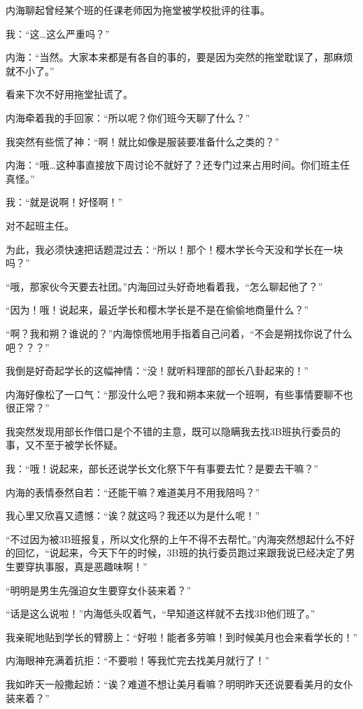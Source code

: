 内海聊起曾经某个班的任课老师因为拖堂被学校批评的往事。

我：“这…这么严重吗？”

内海：“当然。大家本来都是有各自的事的，要是因为突然的拖堂耽误了，那麻烦就不小了。”

看来下次不好用拖堂扯谎了。

内海牵着我的手回家：“所以呢？你们班今天聊了什么？”

我突然有些慌了神：“啊！就比如像是服装要准备什么之类的？”

内海：“哦…这种事直接放下周讨论不就好了？还专门过来占用时间。你们班主任真怪。”

我：“就是说啊！好怪啊！”

对不起班主任。

为此，我必须快速把话题混过去：“所以！那个！樱木学长今天没和学长在一块吗？”

“哦，那家伙今天要去社团。”内海回过头好奇地看着我，“怎么聊起他了？”

“因为！哦！说起来，最近学长和樱木学长是不是在偷偷地商量什么？”

“啊？我和朔？谁说的？”内海惊慌地用手指着自己问着，“不会是朔找你说了什么吧？？？”

我倒是好奇起学长的这幅神情：“没！就听料理部的部长八卦起来的！”

内海好像松了一口气：“那没什么吧？我和朔本来就一个班啊，有些事情要聊不也很正常？”

我突然发现用部长作借口是个不错的主意，既可以隐瞒我去找3B班执行委员的事，又不至于被学长怀疑。

我：“哦！说起来，部长还说学长文化祭下午有事要去忙？是要去干嘛？”

内海的表情泰然自若：“还能干嘛？难道美月不用我陪吗？”

我心里又欣喜又遗憾：“诶？就这吗？我还以为是什么呢！”

“不过因为被3B班报复，所以文化祭的上午不得不去帮忙。”内海突然想起什么不好的回忆，“说起来，今天下午的时候，3B班的执行委员跑过来跟我说已经决定了男生要穿执事服，真是恶趣味啊！”

“明明是男生先强迫女生要穿女仆装来着？”

“话是这么说啦！”内海低头叹着气，“早知道这样就不去找3B他们班了。”

我亲昵地贴到学长的臂膀上：“好啦！能者多劳嘛！到时候美月也会来看学长的！”

内海眼神充满着抗拒：“不要啦！等我忙完去找美月就行了！”

我如昨天一般撒起娇：“诶？难道不想让美月看嘛？明明昨天还说要看美月的女仆装来着？”

